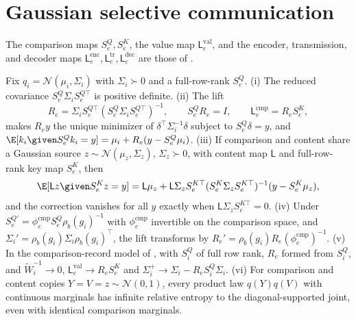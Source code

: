 \section{Gaussian selective communication}

The comparison maps \(S^Q_e,S^K_e\), the value map \(\mathsf L^{\mathrm{val}}_e\),
and the encoder, transmission, and decoder maps
\(\mathsf L^{\mathrm{enc}}_e,\mathsf L^{\mathrm{tr}}_e,\mathsf L^{\mathrm{dec}}_e\)
are those of .

Fix \(q_i=\mathcal N(\mu_i,\Sigma_i)\) with \(\Sigma_i\succ0\) and a full-row-rank
\(S^Q_e\). (i) The reduced covariance \(S^Q_e\Sigma_iS_e^{Q\top}\) is positive
definite. (ii) The lift
\begin{equation}
R_e=\Sigma_iS_e^{Q\top}(S^Q_e\Sigma_iS_e^{Q\top})^{-1},\qquad
S^Q_eR_e=I,\qquad \mathsf L^{\mathrm{cmp}}_e=R_eS^K_e,
\label{eq:geo-selective-gaussian-lift}
\end{equation}
makes \(R_ey\) the unique minimizer of \(\delta^\top\Sigma_i^{-1}\delta\) subject
to \(S^Q_e\delta=y\), and
\(\E[k_i\given S^Q_ek_i=y]=\mu_i+R_e(y-S^Q_e\mu_i)\). (iii) If comparison and
content share a Gaussian source \(z\sim\mathcal N(\mu_z,\Sigma_z)\),
\(\Sigma_z\succ0\), with content map \(\mathsf L\) and full-row-rank key map
\(S^K_e\), then
\begin{equation}
\E[\mathsf Lz\given S^K_ez=y]=\mathsf L\mu_z+
\mathsf L\Sigma_zS_e^{K\top}(S^K_e\Sigma_zS_e^{K\top})^{-1}(y-S^K_e\mu_z),
\label{eq:obs-selective-shared-latent-content}
\end{equation}
and the correction vanishes for all \(y\) exactly when
\(\mathsf L\Sigma_zS_e^{K\top}=0\). (iv) Under \(S_e^{Q\prime}=\phi^{\mathrm{cmp}}_eS^Q_e\rho_b(g_i)^{-1}\)
with \(\phi^{\mathrm{cmp}}_e\) invertible on the comparison space, and
\(\Sigma_i'=\rho_b(g_i)\Sigma_i\rho_b(g_i)^\top\), the lift transforms by
\(R_e'=\rho_b(g_i)R_e(\phi^{\mathrm{cmp}}_e)^{-1}\). (v) In the comparison-record model of
, with \(S^Q_i\) of full row rank,
\(R_e\) formed from \(S^Q_i\), and \(\widetilde W_i^{-1}\to0\),
\(\mathsf L^{\mathrm{val}}_e\to R_eS^K_e\) and
\(\Sigma_i^+\to\Sigma_i-R_eS^Q_i\Sigma_i\). (vi) For comparison and content
copies \(Y=V=z\sim\mathcal N(0,1)\), every product law \(q(Y)q(V)\) with
continuous marginals has infinite relative entropy to the diagonal-supported
joint, even with identical comparison marginals. 

